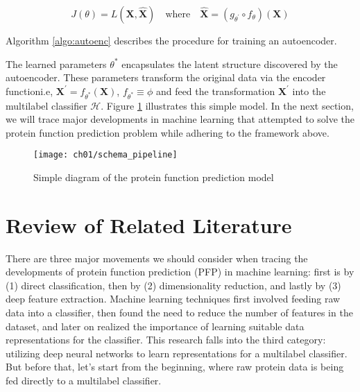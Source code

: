 \[
    J(\theta) = L(\mathbf{X}, \mathbf{\widehat{X}}) \quad \text{where} \quad
    \mathbf{\widehat{X}} = (g_{\theta^{\prime}} \circ f_{\theta}) (\mathbf{X})
\]

Algorithm \ref{algo:autoenc} describes the procedure for training an autoencoder.



The learned parameters $\theta^{\ast}$ encapsulates the latent structure
discovered by the autoencoder. These parameters transform the original data
via the encoder function\textemdash i.e, $ \mathbf{X}^{\prime} =
f_{\theta^{\ast}}(\mathbf{X})$, $f_{\theta^{\ast}} \equiv \phi$\textemdash
and feed the transformation $\mathbf{X}^{\prime}$ into the multilabel
classifier $\mathcal{H}$. Figure \ref{schema:pipeline} illustrates this
simple model. In the next section, we will trace major developments in
machine learning that attempted to solve the protein function prediction
problem while adhering to the framework above.


\begin{figure}[!t]
  \centering
  \texttt{[image: ch01/schema\_pipeline]}
  \caption{Simple diagram of the protein function prediction model}
  \label{schema:pipeline}
\end{figure}

\section{Review of Related Literature}
\label{LiteratureReview}

\par There are three major movements we should consider when tracing the
developments of protein function prediction (PFP) in machine learning: first
is by (1) direct classification, then by (2) dimensionality reduction, and
lastly by (3) deep feature extraction. Machine learning techniques first
involved feeding raw data into a classifier, then found the need to reduce
the number of features in the dataset, and later on realized the importance
of learning suitable data representations for the classifier. This research
falls into the third category: utilizing deep neural networks to learn
representations for a multilabel classifier. But before that, let's start
from the beginning, where raw protein data is being fed directly to a
multilabel classifier.

